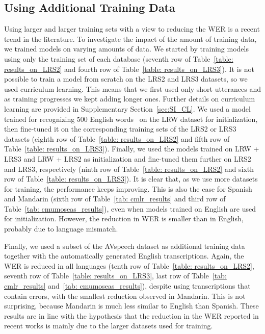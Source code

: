 \documentclass[twocolumn]{article}
\begin{document}
\subsection{Using Additional Training Data}
Using larger and larger training sets with a view to reducing the WER is a recent trend in the literature. To investigate the impact of the amount of training data, we trained models on varying amounts of data. We started by training models using only the training set of each database (seventh row of Table~\ref{table: results_on_LRS2} and fourth row of Table~\ref{table: results_on_LRS3}). It is not possible to train a model from scratch on the LRS2 and LRS3 datasets, so we used curriculum learning. This means that we first used only short utterances and as training progresses we kept adding longer ones. Further details on curriculum learning are provided in Supplementary Section~\ref{sec:SI_CL}. We used a model trained for recognizing 500 English words~\cite{ma2020towards} on the LRW dataset for initialization, then fine-tuned it on the corresponding training sets of the LRS2 or LRS3 datasets (eighth row of Table~\ref{table: results_on_LRS2} and fifth row of Table~\ref{table: results_on_LRS3}). Finally, we used the models trained on LRW + LRS3 and LRW + LRS2 as initialization and fine-tuned them further on LRS2 and LRS3, respectively (ninth row of Table~\ref{table: results_on_LRS2} and sixth row of Table~\ref{table: results_on_LRS3}). It is clear that, as we use more datasets for training, the performance keeps improving. This is also the case for Spanish and Mandarin (sixth row of Table~\ref{tab: cmlr_results} and third row of Table~\ref{tab: cmumoseas_results}), even when models trained on English are used for initialization. However, the reduction in WER is smaller than in English, probably due to language mismatch.

Finally, we used a subset of the AVspeech dataset as additional training data together with the automatically generated English transcriptions. Again, the WER is reduced in all languages (tenth row of Table~\ref{table: results_on_LRS2}, seventh row of Table~\ref{table: results_on_LRS3}, last row of Table~\ref{tab: cmlr_results} and~\ref{tab: cmumoseas_results}), despite using transcriptions that contain errors, with the smallest reduction observed in Mandarin. This is not surprising, because Mandarin is much less similar to English than Spanish. These results are in line with the hypothesis that the reduction in the WER reported in recent works is mainly due to the larger datasets used for training.
\end{document}
